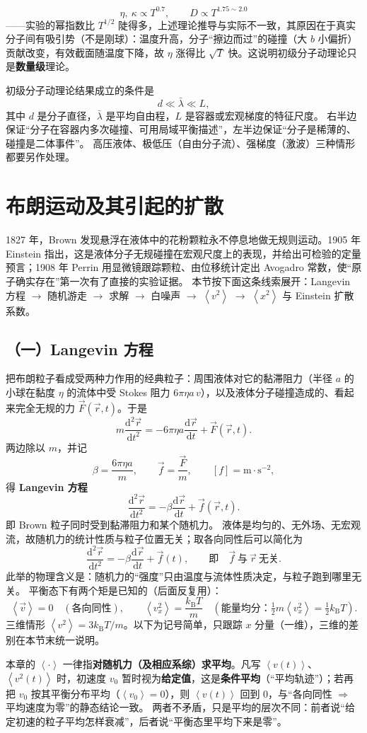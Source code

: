 \documentclass[11pt,a4paper,openany]{ctexbook}
\newcommand{\dd}{\mathrm d}
\newcommand{\avg}[1]{\left\langle #1\right\rangle}
\newcommand{\kBT}{k_{\mathrm B}T}
\begin{document}
\[\eta,\ \kappa\propto T^{0.7},
\qquad
D\propto T^{1.75\sim2.0}\]
——实验的幂指数比 $T^{1/2}$ 陡得多，上述理论推导与实际不一致，其原因在于真实分子间有吸引势（不是刚球）：温度升高，分子“擦边而过”的碰撞（大 $b$ 小偏折）贡献改变，有效截面随温度下降，故 $\eta$ 涨得比 $\sqrt T$ 快。这说明初级分子动理论只是\textbf{数量级}理论。

\begin{notebox}
初级分子动理论结果成立的条件是
\[
\boxed{d\ll\bar\lambda\ll L},
\]
其中 $d$ 是分子直径，$\bar\lambda$ 是平均自由程，$L$ 是容器或宏观梯度的特征尺度。
右半边保证“分子在容器内多次碰撞、可用局域平衡描述”，左半边保证“分子是稀薄的、碰撞是二体事件”。
高压液体、极低压（自由分子流）、强梯度（激波）三种情形都要另作处理。
\end{notebox}

\section{布朗运动及其引起的扩散}
1827 年，Brown 发现悬浮在液体中的花粉颗粒永不停息地做无规则运动。1905 年 Einstein 指出，这是液体分子无规碰撞在宏观尺度上的表现，并给出可检验的定量预言；1908 年 Perrin 用显微镜跟踪颗粒、由位移统计定出 Avogadro 常数，使“原子确实存在”第一次有了直接的实验证据。
本节按下面这条线索展开：Langevin 方程 $\to$ 随机游走 $\to$ 求解 $\to$ 白噪声 $\to$ $\avg{v^2}$ $\to$ $\avg{x^2}$ 与 Einstein 扩散系数。
\subsection*{（一）Langevin 方程}
把布朗粒子看成受两种力作用的经典粒子：周围液体对它的黏滞阻力（半径 $a$ 的小球在黏度 $\eta$ 的流体中受 Stokes 阻力 $6\pi\eta a\,v$），以及液体分子碰撞造成的、看起来完全无规的力 $\vec F(\vec r,t)$。于是
\[
m\frac{\dd^2\vec r}{\dd t^2}
=-6\pi\eta a\frac{\dd\vec r}{\dd t}+\vec F(\vec r,t).
\]
两边除以 $m$，并记
\[
\beta=\frac{6\pi\eta a}{m},\qquad
\vec f=\frac{\vec F}{m},
\qquad [f]=\mathrm{m\cdot s^{-2}},
\]
得 \textbf{Langevin 方程}
\[
\boxed{\frac{\dd^2\vec r}{\dd t^2}
=-\beta\frac{\dd\vec r}{\dd t}+\vec f(\vec r,t)} .
\]
即 Brown 粒子同时受到黏滞阻力和某个随机力。
液体是均匀的、无外场、无宏观流，故随机力的统计性质与粒子位置无关；取各向同性后可以简化为
\[
\frac{\dd^2\vec r}{\dd t^2}
=-\beta\frac{\dd\vec r}{\dd t}+\vec f(t),
\qquad\text{即}\quad \vec f\ \text{与}\ \vec r\ \text{无关}.
\]
此举的物理含义是：随机力的“强度”只由温度与流体性质决定，与粒子跑到哪里无关。
平衡态下有两个矩是已知的（后面反复用）：
\[
\avg{\vec v}=0\quad(\text{各向同性}),
\qquad
\avg{v_x^2}=\frac{\kBT}{m}\quad(\text{能量均分：}\tfrac12m\avg{v_x^2}=\tfrac12\kBT).
\]
三维情形 $\avg{v^2}=3\kBT/m$。以下为记号简单，只跟踪 $x$ 分量（一维），三维的差别在本节末统一说明。
\begin{notebox}[title={平均的约定}]
本章的 $\avg{\cdot}$ 一律指\textbf{对随机力（及相应系综）求平均}。凡写 $\avg{v(t)}$、$\avg{v^2(t)}$ 时，初速度 $v_0$ 暂时视为\textbf{给定值}，这是\textbf{条件平均}（“平均轨迹”）；若再把 $v_0$ 按其平衡分布平均（$\avg{v_0}=0$），则 $\avg{v(t)}$ 回到 $0$，与“各向同性 $\Rightarrow$ 平均速度为零”的静态结论一致。
两者不矛盾，只是平均的层次不同：前者说“给定初速的粒子平均怎样衰减”，后者说“平衡态里平均下来是零”。
\end{notebox}
\end{document}
